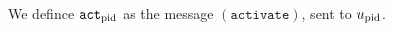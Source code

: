 \begin{definition}
  We defince $\mathtt{act}_{\mathrm{pid}}$ as the message
  $\left(\mathtt{activate}\right)$, sent to $u_{\mathrm{pid}}$.
\end{definition}
